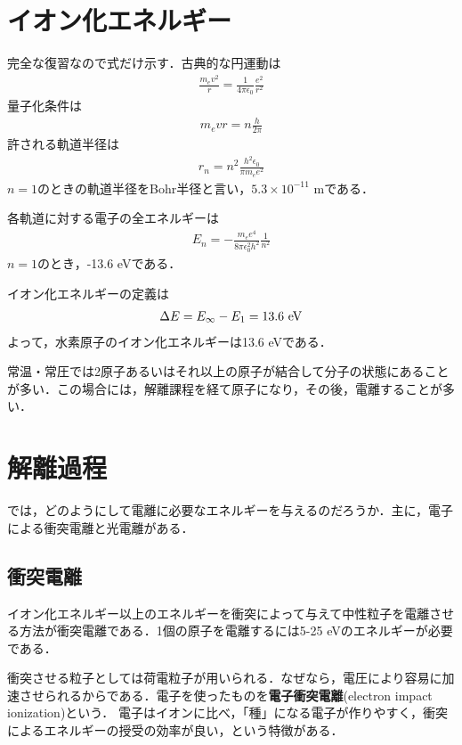 \documentclass{report}
\begin{document}
\section{イオン化エネルギー}
完全な復習なので式だけ示す．古典的な円運動は
\begin{align}
  \frac{m_ev^2}{r} = \frac{1}{4\pi\epsilon_0}\frac{e^2}{r^2}
\end{align}
量子化条件は
\begin{align}
  m_e vr = n\frac{h}{2\pi}
\end{align}
許される軌道半径は
\begin{align}
  r_n = n^2 \frac{h^2\epsilon_0}{\pi m_e e^2}
\end{align}
$n=1$のときの軌道半径をBohr半径と言い，$5.3\times10^{-11}$ mである．

各軌道に対する電子の全エネルギーは
\begin{align}
  E_n = -\frac{m_ee^4}{8\pi\epsilon_0^2h^2}\frac{1}{n^2}
\end{align}
$n=1$のとき，-13.6 eVである．

イオン化エネルギーの定義は
\begin{align}
  \Delta E = E_{\infty} - E_1 = 13.6\ \mathrm{eV}
\end{align}
よって，水素原子のイオン化エネルギーは13.6 eVである．

常温・常圧では2原子あるいはそれ以上の原子が結合して分子の状態にあることが多い．この場合には，解離課程を経て原子になり，その後，電離することが多い．

\section{解離過程}
では，どのようにして電離に必要なエネルギーを与えるのだろうか．主に，電子による衝突電離と光電離がある．

\subsection{衝突電離}
イオン化エネルギー以上のエネルギーを衝突によって与えて中性粒子を電離させる方法が衝突電離である．1個の原子を電離するには5-25 eVのエネルギーが必要である．

衝突させる粒子としては荷電粒子が用いられる．なぜなら，電圧により容易に加速させられるからである．電子を使ったものを\textbf{電子衝突電離}(electron impact ionization)という．
電子はイオンに比べ，「種」になる電子が作りやすく，衝突によるエネルギーの授受の効率が良い，という特徴がある．
\end{document}
